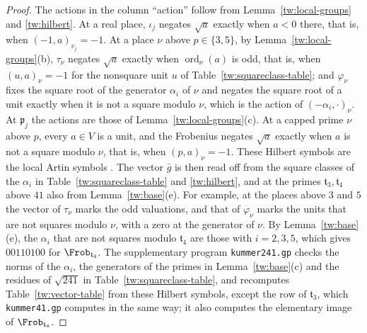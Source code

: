 \begin{proof}
The actions in the column ``action'' follow from
Lemma~\ref{tw:local-groups} and \eqref{tw:hilbert}. At a real place,
$\iota_j$ negates $\sqrt a$ exactly when $a<0$ there, that is, when
$(-1,a)_{v_j}=-1$. At a place $\nu$ above $p\in\{3,5\}$, by
Lemma~\ref{tw:local-groups}(b), $\tau_\nu$ negates $\sqrt a$ exactly when
$\operatorname{ord}_\nu(a)$ is odd, that is, when $(u,a)_\nu=-1$ for the
nonsquare unit $u$ of Table~\ref{tw:squareclass-table}; and $\varphi_\nu$
fixes the square root of the generator $\alpha_i$ of $\nu$ and negates the
square root of a unit exactly when it is not a square modulo $\nu$, which is
the action of $(-\alpha_i,\cdot)_\nu$. At $\mathfrak p_j$ the actions are
those of Lemma~\ref{tw:local-groups}(c). At a capped prime $\nu$ above $p$,
every $a\in V$ is a unit, and the Frobenius negates $\sqrt a$ exactly when
$a$ is not a square modulo $\nu$, that is, when $(p,a)_\nu=-1$. These
Hilbert symbols are the local Artin symbols
\cite[Chapter~III, Remark~4.5]{MilneCFT}. The vector $\bar g$
is then read off from the square classes of the $\alpha_i$ in
Table~\ref{tw:squareclass-table} and \eqref{tw:hilbert}, and at the primes
$\mathfrak t_3,\mathfrak t_4$ above $41$ also from Lemma~\ref{tw:base}(e). For example, at the places above $3$ and
$5$ the vector of $\tau_\nu$ marks the odd valuations, and that of
$\varphi_\nu$ marks the units that are not squares modulo $\nu$, with a zero
at the generator of $\nu$. By Lemma~\ref{tw:base}(e), the $\alpha_i$ that are
not squares modulo $\mathfrak t_4$ are those with $i=2,3,5$, which gives
$00110100$ for $\Frob_{\mathfrak t_4}$. The supplementary program
\texttt{kummer241.gp} checks the norms of the $\alpha_i$, the generators of
the primes in Lemma~\ref{tw:base}(c) and the residues of $\sqrt{241}$ in
Table~\ref{tw:squareclass-table}, and recomputes
Table~\ref{tw:vector-table} from these Hilbert symbols, except the row of
$\mathfrak t_3$, which \texttt{kummer41.gp} computes in the same way; it also
computes the elementary image of $\Frob_{\mathfrak t_4}$.
\end{proof}

